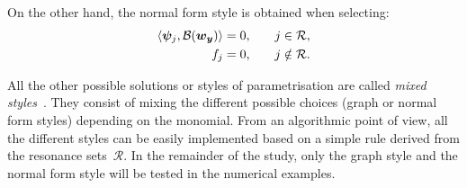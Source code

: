 \documentclass[%
reprint,
superscriptaddress,
 amsmath,amssymb,
 aps,
 pre
]{revtex4-2}
\newcommand{\alessio}[1]{\textcolor{cyan!80!black}{#1}}
\begin{document}
On the other hand, the normal form style is obtained when selecting:
\begin{subequations}
 \label{eq:constraints_normal_form_style}
 \begin{align}
     \langle \boldsymbol{\psi}_j, \mathcal{B} (\boldsymbol{w}_{{\boldsymbol{y}}}) \rangle = 0, \qquad &j \in \mathcal{R},\\
     f_j = 0, \qquad &j \notin \mathcal{R}.
 \end{align}
 \end{subequations}


All the other possible solutions or styles of parametrisation are called {\it mixed styles}~\cite{Haro}. They consist of mixing the different possible choices (graph or normal form styles) depending on the monomial. From an algorithmic point of view, all the different styles can be easily implemented based on a simple rule derived from the resonance sets~$\mathcal{R}$. In the remainder of the study, only the graph style and the normal form style will be tested in the numerical examples.

\end{document}
